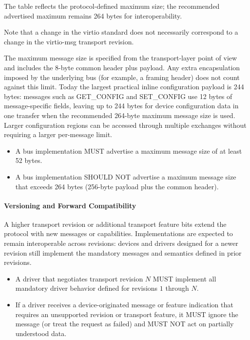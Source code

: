 The table reflects the protocol-defined maximum size; the recommended
advertised maximum remains 264 bytes for interoperability.

Note that a change in the virtio standard does not necessarily
correspond to a change in the virtio-msg transport revision.

The maximum message size is specified from the transport-layer point of view
and includes the 8-byte common header plus payload. Any extra encapsulation
imposed by the underlying bus (for example, a framing header) does not count
against this limit. Today the largest practical inline configuration payload is
244 bytes: messages such as GET_CONFIG and SET_CONFIG use 12 bytes of
message-specific fields, leaving up to 244 bytes for device configuration data
in one transfer when the recommended 264-byte maximum message size is used.
Larger configuration regions can be accessed through multiple exchanges without
requiring a larger per-message limit.

\begin{itemize}
  \item A bus implementation MUST advertise a maximum message size of at least
        52 bytes.
  \item A bus implementation SHOULD NOT advertise a maximum message size that
        exceeds 264 bytes (256-byte payload plus the common header).
\end{itemize}

\paragraph{Versioning and Forward Compatibility}

A higher transport revision or additional transport feature bits extend the
protocol with new messages or capabilities. Implementations are expected to
remain interoperable across revisions: devices and drivers designed for a newer
revision still implement the mandatory messages and semantics defined in prior
revisions.

\begin{itemize}
  \item A driver that negotiates transport revision $N$ MUST implement all
        mandatory driver behavior defined for revisions $1$ through $N$.
  \item If a driver receives a device-originated message or feature indication
        that requires an unsupported revision or transport feature, it MUST
        ignore the message (or treat the request as failed) and MUST NOT act on
        partially understood data.
\end{itemize}

